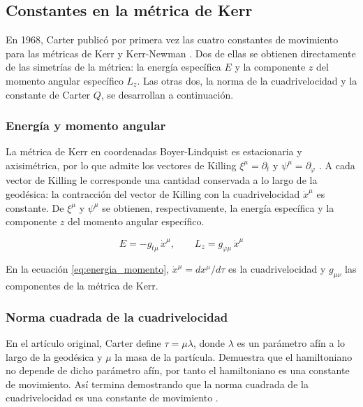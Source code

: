 \subsection{Constantes en la métrica de Kerr}

En 1968, Carter publicó por primera vez las cuatro constantes de movimiento para las métricas de Kerr y Kerr-Newman \cite{carter1968global}. Dos de ellas se obtienen directamente de las simetrías de la métrica: la energía específica $E$ y la componente $z$ del momento angular específico $L_z$. Las otras dos, la norma de la cuadrivelocidad y la constante de Carter $Q$, se desarrollan a continuación.

\subsubsection{Energía y momento angular}

La métrica de Kerr en coordenadas Boyer-Lindquist es estacionaria y axisimétrica, por lo que admite los vectores de Killing $\xi^\mu = \partial_t$ y $\psi^\mu = \partial_\varphi$ \cite{carter1968global}. A cada vector de Killing le corresponde una cantidad conservada a lo largo de la geodésica: la contracción del vector de Killing con la cuadrivelocidad $\dot{x}^\mu$ es constante. De $\xi^\mu$ y $\psi^\mu$ se obtienen, respectivamente, la energía específica y la componente $z$ del momento angular específico.

\begin{equation}
    E = -g_{t\mu}\,\dot{x}^\mu, \qquad L_z = g_{\varphi\mu}\,\dot{x}^\mu \label{eq:energia_momento}
\end{equation}

En la ecuación \eqref{eq:energia_momento}, $\dot{x}^\mu = dx^\mu/d\tau$ es la cuadrivelocidad y $g_{\mu\nu}$ las componentes de la métrica de Kerr.

\subsubsection{Norma cuadrada de la cuadrivelocidad}

En el artículo original, Carter define $\tau = \mu \lambda$, donde $\lambda$ es un parámetro afín a lo largo de la geodésica y $\mu$ la masa de la partícula. Demuestra que el hamiltoniano no depende de dicho parámetro afín, por tanto el hamiltoniano es una constante de movimiento. Así termina demostrando que la norma cuadrada de la cuadrivelocidad es una constante de movimiento \cite{carter1968global}.

